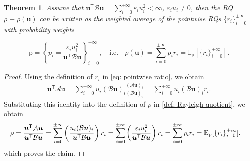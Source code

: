 \documentclass[11pt]{article}
\newtheorem{thm}{Theorem}[section]
\numberwithin{equation}{section}
\begin{document}
\begin{thm} \label{thm: Hadamard quotient}
    Assume that $\boldsymbol{u}^\mathsf{T} \mathcal{B} \boldsymbol{u} = \sum_{i=0}^{\pm\infty} \varepsilon_i u_i^2 < \infty$, $\varepsilon_i u_i\neq0$, then the RQ $\rho \equiv \rho(\boldsymbol{u})$ can be written as the weighted average of the pointwise RQs $\{r_i\}_{i=0}^{\pm \infty}$ with probability weights

\begin{equation} \label{set: probability density}
 \mathrm{p} = \left\{ p_i = \frac{\varepsilon_{i} u_{i}^2}{\boldsymbol{u}^{\mathsf{T}} \mathcal{B} \boldsymbol{u}} \right\}_{i=0}^{\pm \infty}, \quad \text{i.e.} \quad \rho(\boldsymbol{u}) = \sum_{i=0}^{\pm \infty} p_i r_i = \mathbb{E}_{\mathrm{p}}\left[\{r_i\}_{i=0}^{\pm \infty}\right].
\end{equation}
\end{thm}

\begin{proof}
    Using the definition of $r_i$ in \eqref{eq: pointwise ratio}, we obtain
\begin{align} \label{eq: RQ derive part}
\boldsymbol{u}^\mathsf{T} \mathcal{A} \boldsymbol{u} = \sum_{i=0}^{\pm \infty} u_i (\mathcal{B}\boldsymbol{u})_i \frac{(\mathcal{A}\boldsymbol{u})_i}{(\mathcal{B}\boldsymbol{u})_i} =  \sum_{i=0}^{\pm\infty} u_i (\mathcal{B}\boldsymbol{u})_i r_i.
\end{align}
 Substituting this identity into the definition of $\rho$ in \eqref{def: Rayleigh quotient}, we obtain
\begin{align} \label{eq: RQ derive all}
\rho &=  \frac{\boldsymbol{u}^\mathsf{T} \mathcal{A} \boldsymbol{u}}{\boldsymbol{u}^\mathsf{T} \mathcal{B}\boldsymbol{u}} = \sum_{i=0}^{\pm \infty}
\left(
\frac{u_i (\mathcal{B}\boldsymbol{u})_i}{\boldsymbol{u}^\mathsf{T} \mathcal{B} \boldsymbol{u}}
\right) r_i\notag = \sum_{i=0}^{\pm \infty}
\left(
\frac{\varepsilon_i u_i^2 }{\boldsymbol{u}^\mathsf{T} \mathcal{B}\boldsymbol{u}}
\right) r_i
= \sum_{i=0}^{\pm \infty}
p_i r_i
= \mathbb{E}_{\mathrm{p}}[\{r_i\}_{i=0}^{\pm \infty}],
\end{align}
which proves the claim.
\end{proof}
\end{document}
